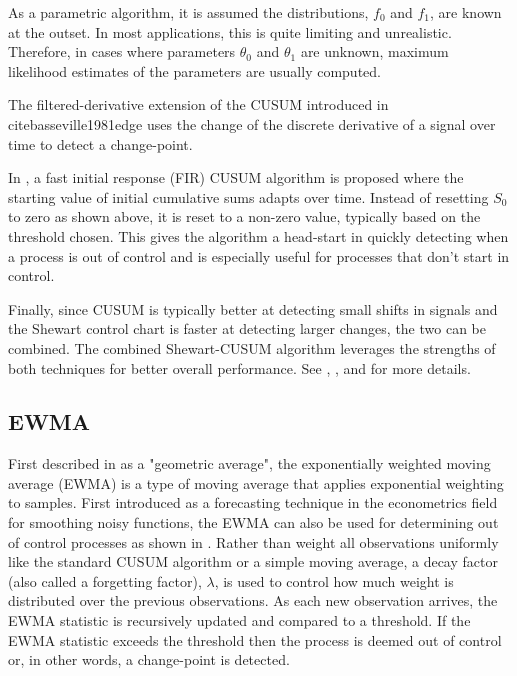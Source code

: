 As a parametric algorithm, it is assumed the distributions, $f_0$ and $f_1$, are known at the outset. In most applications, this is quite limiting and unrealistic. Therefore, in cases where parameters $\theta_0$ and $\theta_1$ are unknown, maximum likelihood estimates of the parameters are usually computed.

The filtered-derivative extension of the CUSUM introduced in \\cite{basseville1981edge} uses the change of the discrete derivative of a signal over time to detect a change-point. 

In \cite{lucas1982fast}, a fast initial response (FIR) CUSUM algorithm is proposed where the starting value of initial cumulative sums adapts over time. Instead of resetting $S_0$ to zero as shown above, it is reset to a non-zero value, typically based on the threshold chosen. This gives the algorithm a head-start in quickly detecting when a process is out of control and is especially useful for processes that don't start in control.

Finally, since CUSUM is typically better at detecting small shifts in signals and the Shewart control chart is faster at detecting larger changes, the two can be combined. The combined Shewart-CUSUM algorithm leverages the strengths of both techniques for better overall performance. See \cite{lucas1982combined}, \cite{yashchin1985analysis}, and \cite{westgard1977combined} for more details. 

\subsection{EWMA}
First described in \cite{roberts1959control} as a "geometric average", the exponentially weighted moving average (EWMA) is a type of moving average that applies exponential weighting to samples. First introduced as a forecasting technique in the econometrics field for smoothing noisy functions, the EWMA can also be used for determining out of control processes as shown in \cite{hunter1986exponentially}. Rather than weight all observations uniformly like the standard CUSUM algorithm or a simple moving average, a decay factor (also called a  forgetting factor), $\lambda$, is used to control how much weight is distributed over the previous observations. As each new observation arrives, the EWMA statistic is recursively updated and compared to a threshold. If the EWMA statistic exceeds the threshold then the process is deemed out of control or, in other words, a change-point is detected.

